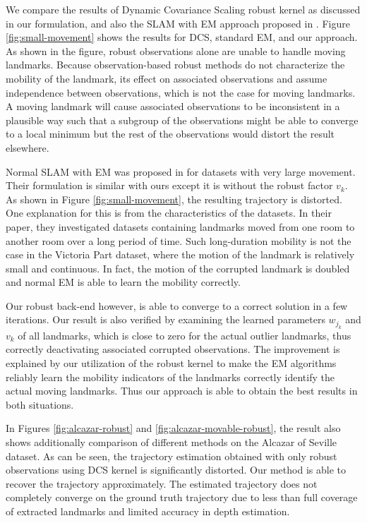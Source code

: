 We compare the results of Dynamic Covariance Scaling robust kernel as discussed in our
formulation, and also the SLAM with EM approach proposed in \cite{rogers2010slam}.  Figure \ref{fig:small-movement} shows the results for DCS, standard EM, and our
approach. As shown in the figure, robust observations alone are unable to
handle moving landmarks. Because observation-based robust methods do
not characterize the mobility of the landmark, its effect on associated
observations and assume independence between observations, which is not the case for moving landmarks. A moving landmark will cause associated observations to
be inconsistent in a plausible way such that a subgroup of the observations
might be able to converge to a local minimum but the rest of the observations
would distort the result elsewhere. 

Normal SLAM with EM was proposed in \cite{rogers2010slam} for datasets with
very large movement. Their formulation is similar with ours except it is
without the robust factor $v_k$.  As shown in Figure \ref{fig:small-movement},
the resulting trajectory is distorted. One explanation for this is from the
characteristics of the datasets.  In their paper, they investigated datasets
containing landmarks moved from one room to another room over a long period of
time. %
Such long-duration mobility is not the case in the Victoria Part dataset, where the motion of the landmark is relatively small and continuous. In fact, %
the motion of the
corrupted landmark is doubled and normal EM is able to learn the mobility
correctly.

Our robust back-end however, is able to converge to a correct solution in a few
iterations. Our result is also verified by examining the learned parameters
$w_{j_k}$ and $v_k$ of all landmarks, which is close to zero for the actual
outlier landmarks, thus correctly deactivating associated corrupted
observations.  The improvement is explained by our utilization of the robust
kernel to make the EM algorithms reliably learn the mobility indicators of the
landmarks correctly identify the actual moving landmarks. Thus our approach is
able to obtain the best results in both situations.

In Figures \ref{fig:alcazar-robust} and \ref{fig:alcazar-movable-robust}, the
result also shows additionally comparison of different methods on the Alcazar of
Seville dataset. As can be seen, the trajectory estimation obtained with only
robust observations using DCS kernel is significantly distorted. Our method is
able to recover the trajectory approximately. The estimated trajectory does not
completely converge on the ground truth trajectory due to less than full
coverage of extracted landmarks and limited accuracy in depth estimation.

